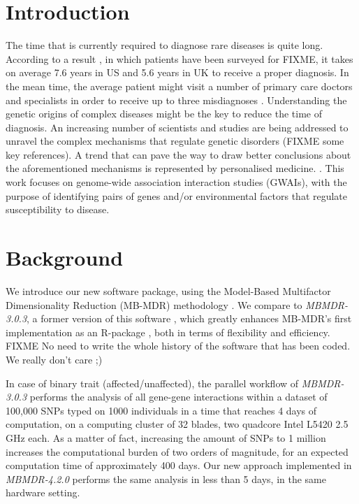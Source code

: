 \documentclass{bmcart}
\begin{document}
\section*{Introduction}
The time that is currently required to diagnose rare diseases is quite long. According to a result \cite{Shire2013}, in which patients have been surveyed for FIXME, it takes on average 7.6 years in US and 5.6 years in UK to receive a proper diagnosis. In the mean time, the average patient might visit a number of primary care doctors and specialists in order to receive up to three misdiagnoses \cite{Shire2013}. Understanding the genetic origins of complex diseases might be the key to reduce the time of diagnosis. An increasing number of scientists and studies are being addressed to unravel the complex mechanisms that regulate genetic disorders (FIXME some key references).
A trend that can pave the way to draw better conclusions about the aforementioned mechanisms is represented by personalised medicine.   
\cite{Shastry2006, VantVeer2008, Galas2009, Beevers2012, Lester2013}. This work focuses on genome-wide association interaction studies (GWAIs), with the purpose of identifying pairs of genes and/or environmental factors that regulate susceptibility to disease.

\section*{Background}


We introduce our new software package, using the Model-Based Multifactor Dimensionality Reduction (MB-MDR) methodology \cite{Calle2008, Calle2008b, Cattaert2011,Mahachie2012}. We compare to {\em MBMDR-3.0.3}, a former version of this software \cite{VanLishout2013}, which greatly enhances MB-MDR's first implementation as an R-package \cite{Calle2010}, both in terms of flexibility and efficiency. 
FIXME No need to write the whole history of the software that has been coded. We really don't care ;)


In case of binary trait (affected/unaffected), the parallel workflow of {\em MBMDR-3.0.3} performs the analysis of all gene-gene interactions within a dataset of 100,000 SNPs typed on 1000 individuals in a time that reaches 4 days of computation, on a computing cluster of 32 blades, two quadcore Intel L5420 2.5 GHz each. As a matter of fact, increasing the amount of SNPs to 1 million increases the computational burden of two orders of magnitude, for an expected computation time of approximately 400 days. Our new approach implemented in {\em MBMDR-4.2.0} performs the same analysis in less than 5 days, in the same hardware setting.
\end{document}
